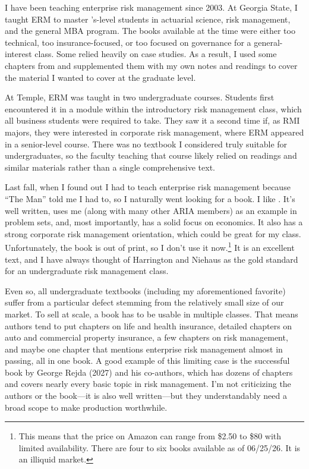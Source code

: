 \documentclass[11pt,letterpaper]{article}
\begin{document}
I have been teaching enterprise risk management since 2003. At Georgia State, I taught ERM to master 's-level students in actuarial science, risk management, and the general MBA program. The books available at the time were either too technical, too insurance-focused, or too focused on governance for a general-interest class. Some relied heavily on case studies. As a result, I used some chapters from \cite{Doherty2000} and supplemented them with my own notes and readings to cover the material I wanted to cover at the graduate level.

At Temple, ERM was taught in two undergraduate courses. Students first encountered it in a module within the introductory risk management class, which all business students were required to take. They saw it a second time if, as RMI majors, they were interested in corporate risk management, where ERM appeared in a senior-level course. There was no textbook I considered truly suitable for undergraduates, so the faculty teaching that course likely relied on readings and similar materials rather than a single comprehensive text.

Last fall, when I found out I had to teach enterprise risk management because ``The Man'' told me I had to, so I naturally went looking for a book. I like \cite{Harrington2003}. It's well written, uses me (along with many other ARIA members) as an example in problem sets, and, most importantly, has a solid focus on economics. It also has a strong corporate risk management orientation, which could be great for my class. Unfortunately, the book is out of print, so I don't use it now.\footnote{This means that the price on Amazon can range from \$2.50 to \$80 with limited availability. There are four to six books available as of 06/25/26. It is an illiquid market.} It is an excellent text, and I have always thought of Harrington and Niehaus as the gold standard for an undergraduate risk management class.

Even so, all undergraduate textbooks (including my aforementioned favorite) suffer from a particular defect stemming from the relatively small size of our market. To sell at scale, a book has to be usable in multiple classes. That means authors tend to put chapters on life and health insurance, detailed chapters on auto and commercial property insurance, a few chapters on risk management, and maybe one chapter that mentions enterprise risk management almost in passing, all in one book. A good example of this limiting case is the successful book by George Rejda (2027) and his co-authors, which has dozens of chapters and covers nearly every basic topic in risk management. I'm not criticizing the authors or the book—it is also well written—but they understandably need a broad scope to make production worthwhile.
\end{document}
